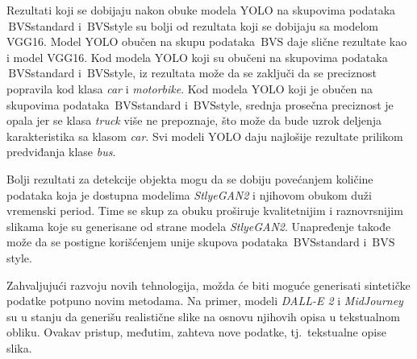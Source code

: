 \documentclass[12pt,oneside]{memoir}
\newcommand{\bvs}{\ensuremath{\,\textrm{BVS}}}
\begin{document}
Rezultati koji se dobijaju nakon obuke modela YOLO na skupovima podataka \bvs{standard} i \bvs{style} su bolji od rezultata koji se dobijaju sa modelom VGG16. Model YOLO obučen na skupu podataka \bvs{} daje slične rezultate kao i model VGG16. Kod modela YOLO koji su obučeni na skupovima podataka \bvs{standard} i \bvs{style}, iz rezultata može da se zaključi da se preciznost popravila kod klasa \textit{car} i \textit{motorbike}. Kod modela YOLO koji je obučen na skupovima podataka \bvs{standard} i \bvs{style}, srednja prosečna preciznost je opala jer se klasa \textit{truck} više ne prepoznaje, što može da bude uzrok deljenja karakteristika sa klasom \textit{car}. Svi modeli YOLO daju najlošije rezultate prilikom predviđanja klase \textit{bus}.


Bolji rezultati za detekcije objekta mogu da se dobiju povećanjem količine podataka koja je dostupna modelima \textit{StlyeGAN2} i njihovom obukom duži vremenski period. Time se skup za obuku proširuje kvalitetnijim i raznovrsnijim slikama koje su generisane od strane modela \textit{StlyeGAN2}.
Unapređenje takođe može da se postigne korišćenjem unije skupova podataka \bvs{standard} i \bvs{style}.

Zahvaljujući razvoju novih tehnologija, možda će biti moguće generisati sintetičke podatke potpuno novim metodama. Na primer, modeli \textit{DALL-E 2} \cite{reddy2021dall} i \textit{MidJourney} \cite{midjourney2022} su u stanju da generišu realistične slike na osnovu njihovih opisa u tekstualnom obliku. Ovakav pristup, međutim, zahteva nove podatke, tj.~tekstualne opise slika.


\end{document}
